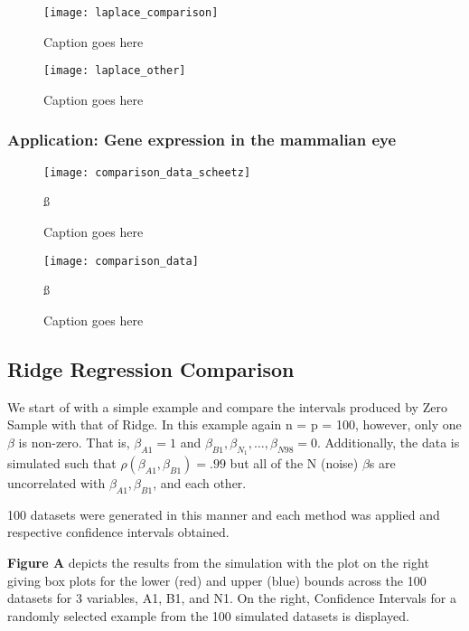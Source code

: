 \begin{figure}
  \texttt{[image: laplace\_comparison]}
  \caption{\label{Fig:laplace_comparison} Caption goes here}
\end{figure}


\begin{figure}
  \texttt{[image: laplace\_other]}
  \caption{\label{Fig:laplace_other} Caption goes here}
\end{figure}


\subsubsection{Application: Gene expression in the mammalian eye}


\begin{figure}
  \texttt{[image: comparison\_data\_scheetz]}
  \caption{\label{Fig:comparison_data_scheetz} Caption goes here}ß
\end{figure}

\begin{figure}
  \texttt{[image: comparison\_data]}
  \caption{\label{Fig:comparison_data_whoari} Caption goes here}ß
\end{figure}

\subsection{Ridge Regression Comparison}

We start of with a simple example and compare the intervals produced by Zero Sample with that of Ridge. In this example again n = p = 100, however, only one $\beta$ is non-zero. That is, $\beta_{A1} = 1$ and $\beta_{B1}, \beta_{N_1}, \ldots, \beta_{N98} = 0$. Additionally, the data is simulated such that $\rho(\beta_{A1}, \beta_{B1}) = .99$ but all of the N (noise) $\beta$s are uncorrelated with $\beta_{A1}, \beta_{B1}$, and each other.

100 datasets were generated in this manner and each method was applied and respective confidence intervals obtained.

\textbf{Figure A} depicts the results from the simulation with the plot on the right giving box plots for the lower (red) and upper (blue) bounds across the 100 datasets for 3 variables, A1, B1, and N1. On the right, Confidence Intervals for a randomly selected example from the 100 simulated datasets is displayed.

